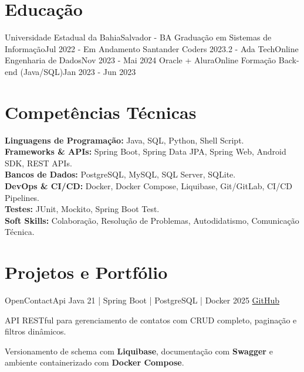 \section{\textbf{Educação}}
\resumeSubHeadingListStart
\resumeSubheading
{Universidade Estadual da Bahia}{Salvador - BA}
{Graduação em Sistemas de Informação}{Jul 2022 - Em Andamento}
\resumeSubheading
{Santander Coders 2023.2 - Ada Tech}{Online}
{Engenharia de Dados}{Nov 2023 - Mai 2024}
\resumeSubheading
{Oracle + Alura}{Online}
{Formação Back-end (Java/SQL)}{Jan 2023 - Jun 2023}
\resumeSubHeadingListEnd
\vspace{-5.5mm}

\section{\textbf{Competências Técnicas}}
\begin{itemize}[leftmargin=0.1in, label={}]
	\small{\item{
	      \textbf{Linguagens de Programação:}{ Java, SQL, Python, Shell Script.} \\
	      \textbf{Frameworks \& APIs:}{ Spring Boot, Spring Data JPA, Spring Web, Android SDK, REST APIs.} \\
	      \textbf{Bancos de Dados:}{ PostgreSQL, MySQL, SQL Server, SQLite.} \\
	      \textbf{DevOps \& CI/CD:}{ Docker, Docker Compose, Liquibase, Git/GitLab, CI/CD Pipelines.} \\
	      \textbf{Testes:}{ JUnit, Mockito, Spring Boot Test.} \\
	      \textbf{Soft Skills:}{ Colaboração, Resolução de Problemas, Autodidatismo, Comunicação Técnica.} \\
	      }}
\end{itemize}
\vspace{-16pt}


\section{\textbf{Projetos e Portfólio}}
\resumeSubHeadingListStart
\resumeProject
{OpenContactApi}
{Java 21 | Spring Boot | PostgreSQL | Docker}
{2025}
{\href{https://github.com/RafaelQSantos-RQS/OpenContactApi}{GitHub}}
\resumeItemListStart
\item {API RESTful para gerenciamento de contatos com CRUD completo, paginação e filtros dinâmicos.}
\item {Versionamento de schema com \textbf{Liquibase}, documentação com \textbf{Swagger} e ambiente containerizado com \textbf{Docker Compose}.}
\resumeItemListEnd

